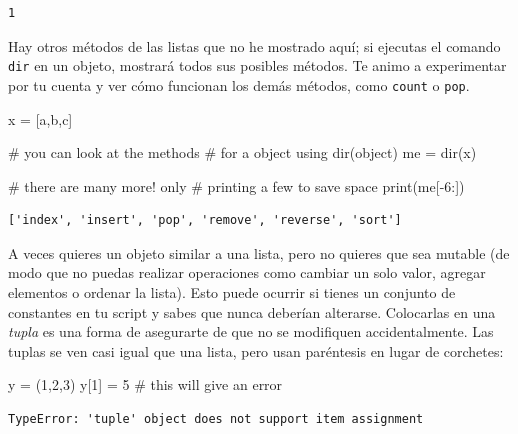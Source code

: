 \documentclass[
  letterpaper,
]{scrbook}
\newenvironment{Shaded}{\begin{snugshade}}{\end{snugshade}}
\newcommand{\BuiltInTok}[1]{\textcolor[rgb]{0.00,0.23,0.31}{#1}}
\newcommand{\CommentTok}[1]{\textcolor[rgb]{0.37,0.37,0.37}{#1}}
\newcommand{\DecValTok}[1]{\textcolor[rgb]{0.68,0.00,0.00}{#1}}
\newcommand{\NormalTok}[1]{\textcolor[rgb]{0.00,0.23,0.31}{#1}}
\newcommand{\OperatorTok}[1]{\textcolor[rgb]{0.37,0.37,0.37}{#1}}
\newcommand{\StringTok}[1]{\textcolor[rgb]{0.13,0.47,0.30}{#1}}
\begin{document}
\begin{verbatim}
1
\end{verbatim}

Hay otros métodos de las listas que no he mostrado aquí; si ejecutas el
comando \texttt{dir} en un objeto, mostrará todos sus posibles métodos.
Te animo a experimentar por tu cuenta y ver cómo funcionan los demás
métodos, como \texttt{count} o \texttt{pop}.

\begin{Shaded}
\begin{Highlighting}[]
\NormalTok{x }\OperatorTok{=}\NormalTok{ [}\StringTok{\textquotesingle{}a\textquotesingle{}}\NormalTok{,}\StringTok{\textquotesingle{}b\textquotesingle{}}\NormalTok{,}\StringTok{\textquotesingle{}c\textquotesingle{}}\NormalTok{]}

\CommentTok{\# you can look at the methods}
\CommentTok{\# for a object using dir(object)}
\NormalTok{me }\OperatorTok{=} \BuiltInTok{dir}\NormalTok{(x)}

\CommentTok{\# there are many more! only}
\CommentTok{\# printing a few to save space}
\BuiltInTok{print}\NormalTok{(me[}\OperatorTok{{-}}\DecValTok{6}\NormalTok{:])}
\end{Highlighting}
\end{Shaded}

\begin{verbatim}
['index', 'insert', 'pop', 'remove', 'reverse', 'sort']
\end{verbatim}

A veces quieres un objeto similar a una lista, pero no quieres que sea
mutable (de modo que no puedas realizar operaciones como cambiar un solo
valor, agregar elementos o ordenar la lista). Esto puede ocurrir si
tienes un conjunto de constantes en tu script y sabes que nunca deberían
alterarse. Colocarlas en una \emph{tupla} es una forma de asegurarte de
que no se modifiquen accidentalmente. Las tuplas se ven casi igual que
una lista, pero usan paréntesis en lugar de corchetes:

\begin{Shaded}
\begin{Highlighting}[]
\NormalTok{y }\OperatorTok{=}\NormalTok{ (}\DecValTok{1}\NormalTok{,}\DecValTok{2}\NormalTok{,}\DecValTok{3}\NormalTok{)}
\NormalTok{y[}\DecValTok{1}\NormalTok{] }\OperatorTok{=} \DecValTok{5} \CommentTok{\# this will give an error}
\end{Highlighting}
\end{Shaded}

\begin{verbatim}
TypeError: 'tuple' object does not support item assignment
\end{verbatim}
\end{document}

